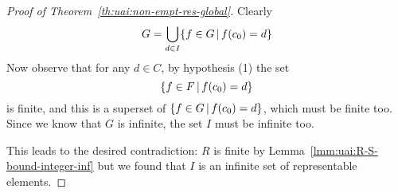 \begin{proof}[Proof of Theorem~\ref{th:uai:non-empt-res-global}]
	Clearly
	\begin{equation*}
		G = \bigcup\limits_{d \in I} \{ f \in G \,\vert\, f(c_0) = d \}
	\end{equation*}
	Now observe that for any $d \in C$, by hypothesis (1) the set
	\begin{equation*}
		\{ f \in F \,\vert\, f(c_0) = d \}
	\end{equation*}
	is finite, and this is a superset of $\{ f \in G \,\vert\, f(c_0) = d \}$, which must be finite too. Since we know that $G$ is infinite, the set $I$ must be infinite too.

	This leads to the desired contradiction: $R$ is finite by Lemma~\ref{lmm:uai:R-S-bound-integer-inf} but we found that $I$ is an infinite set of representable elements.
\end{proof}

